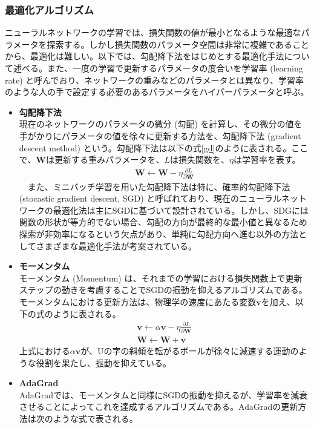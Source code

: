 \subsubsection{最適化アルゴリズム}
ニューラルネットワークの学習では、損失関数の値が最小となるような最適なパラメータを探索する。しかし損失関数のパラメータ空間は非常に複雑であることから、最適化は難しい。以下では、勾配降下法をはじめとする最適化手法について述べる。また、一度の学習で更新するパラメータの度合いを学習率 (learning rate) と呼んでおり、ネットワークの重みなどのパラメータとは異なり、学習率のような人の手で設定する必要のあるパラメータをハイパーパラメータと呼ぶ。
\begin{itemize}
\item \textbf{勾配降下法}\\
現在のネットワークのパラメータの微分 (勾配) を計算し、その微分の値を手がかりにパラメータの値を徐々に更新する方法を、勾配降下法 (gradient descent method) という。勾配降下法は以下の式\ref{gd}のように表される。ここで、$\mathbf{W}$は更新する重みパラメータを、$L$は損失関数を、$\eta$は学習率を表す。
\begin{align}
 \label{gd}
 \mathbf{W} \leftarrow \mathbf{W} - \eta \frac{\partial L}{\partial \mathbf{W}}
\end{align}
　また、ミニバッチ学習を用いた勾配降下法は特に、確率的勾配降下法 (stocastic gradient descent, SGD) と呼ばれており、現在のニューラルネットワークの最適化法は主にSGDに基づいて設計されている。しかし、SDGには関数の形状が等方的でない場合、勾配の方向が最終的な最小値と異なるため探索が非効率になるという欠点があり、単純に勾配方向へ進む以外の方法としてさまざまな最適化手法が考案されている。
\item \textbf{モーメンタム}\\
モーメンタム (Momentum) は、それまでの学習における損失関数上で更新ステップの動きを考慮することでSGDの振動を抑えるアルゴリズムである。モーメンタムにおける更新方法は、物理学の速度にあたる変数$\mathbf{v}$を加え、以下の式のように表される。
\begin{align}
\mathbf{v} \leftarrow \alpha \mathbf{v} - \eta \frac{\partial L}{\partial \mathbf{W}}\\
\mathbf{W} \leftarrow \mathbf{W} + \mathbf{v}
\end{align}
上式における$\alpha \mathbf{v}$が、Uの字の斜傾を転がるボールが徐々に減速する運動のような役割を果たし、振動を抑えている。
\item \textbf{AdaGrad}\\
AdaGradでは、モーメンタムと同様にSGDの振動を抑えるが、学習率を減衰させることによってこれを達成するアルゴリズムである。AdaGradの更新方法は次のような式で表される。

\end{itemize}
